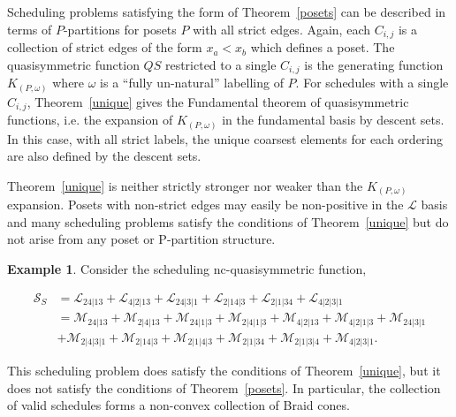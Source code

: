 \documentclass[12pt,reqno]{amsart}
\numberwithin{definition}{section}
\theoremstyle{definition}
\newtheorem{example}[definition]{Example}
\newcommand{\SSS}{\mathcal{S}}
\newcommand{\ncM}{\mathcal{M}}
\newcommand{\ncL}{\mathcal{L}}
\begin{document}
Scheduling problems satisfying the form of Theorem~\ref{posets} can be
described in terms of $P$-partitions for posets $P$ with all strict
edges.  Again, each $C_{i,j}$ is a collection of strict edges of the
form $x_a < x_b$ which defines a poset.  The quasisymmetric function
$QS$ restricted to a single $C_{i,j}$ is the generating function
$K_{(P,\omega)}$ where $\omega$ is a ``fully un-natural'' labelling of
$P$.  For schedules with a single $C_{i,j}$, Theorem~\ref{unique}
gives the Fundamental theorem of quasisymmetric functions, i.e. the
expansion of $K_{(P,\omega)}$ in the fundamental basis by descent
sets.  In this case, with all strict labels, the unique coarsest
elements for each ordering are also defined by the descent sets.


Theorem~\ref{unique} is neither strictly stronger nor weaker than the
$K_{(P,\omega)}$ expansion.  Posets with non-strict edges may easily
be non-positive in the $\ncL$ basis and many scheduling problems
satisfy the conditions of Theorem~\ref{unique} but do not arise from
any poset or P-partition structure.

\begin{example} 
Consider the scheduling nc-quasisymmetric function,

\begin{align*}
\SSS_S & = \ncL_{24|13} + \ncL_{4|2|13} + \ncL_{24|3|1} + \ncL_{2|14|3} + \ncL_{2|1|34} + \ncL_{4|2|3|1}\\
& = \ncM_{24|13} + \ncM_{2|4|13} + \ncM_{24|1|3} + \ncM_{2|4|1|3} + \ncM_{4|2|13} + \ncM_{4|2|1|3} + \ncM_{24|3|1}\\
& + \ncM_{2|4|3|1} + \ncM_{2|14|3} + \ncM_{2|1|4|3} + \ncM_{2|1|34} + \ncM_{2|1|3|4} + \ncM_{4|2|3|1}.
\end{align*}

This scheduling problem does satisfy the conditions of Theorem~\ref{unique}, but it does not satisfy the conditions of Theorem~\ref{posets}.  In particular, the collection of valid schedules forms a non-convex collection of Braid cones.

\end{example}


%


\end{document}

